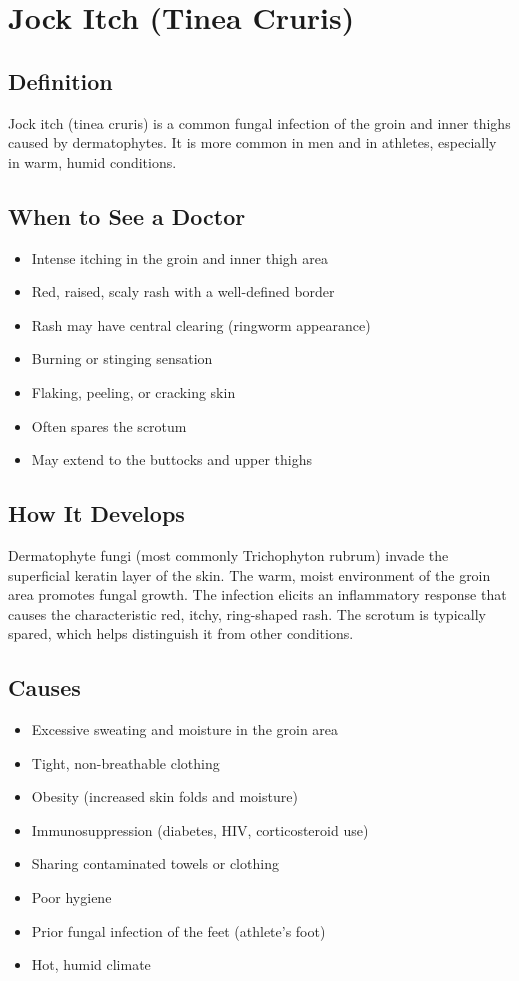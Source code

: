 \chapter{Jock Itch (Tinea Cruris)}

\section*{Definition}
Jock itch (tinea cruris) is a common fungal infection of the groin and inner thighs caused by dermatophytes. It is more common in men and in athletes, especially in warm, humid conditions.

\section*{When to See a Doctor}
\begin{itemize}
\item Intense itching in the groin and inner thigh area
\item Red, raised, scaly rash with a well-defined border
\item Rash may have central clearing (ringworm appearance)
\item Burning or stinging sensation
\item Flaking, peeling, or cracking skin
\item Often spares the scrotum
\item May extend to the buttocks and upper thighs
\end{itemize}

\section*{How It Develops}
Dermatophyte fungi (most commonly Trichophyton rubrum) invade the superficial keratin layer of the skin. The warm, moist environment of the groin area promotes fungal growth. The infection elicits an inflammatory response that causes the characteristic red, itchy, ring-shaped rash. The scrotum is typically spared, which helps distinguish it from other conditions.

\section*{Causes}
\begin{itemize}
\item Excessive sweating and moisture in the groin area
\item Tight, non-breathable clothing
\item Obesity (increased skin folds and moisture)
\item Immunosuppression (diabetes, HIV, corticosteroid use)
\item Sharing contaminated towels or clothing
\item Poor hygiene
\item Prior fungal infection of the feet (athlete's foot)
\item Hot, humid climate
\end{itemize}

